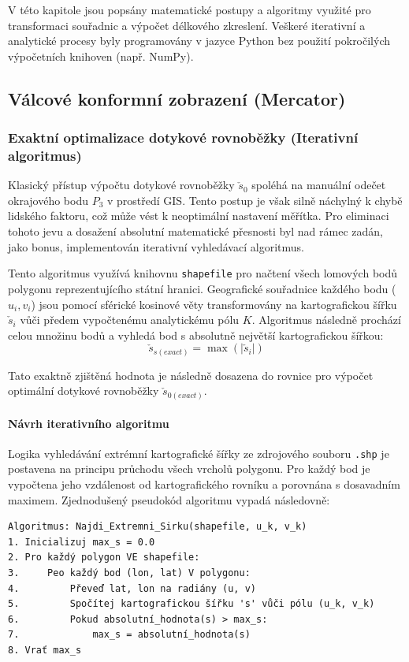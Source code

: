 \documentclass[12pt, a4paper]{article}
\begin{document}
V této kapitole jsou popsány matematické postupy a algoritmy využité pro transformaci souřadnic a výpočet délkového zkreslení. Veškeré iterativní a analytické procesy byly programovány v jazyce Python bez použití pokročilých výpočetních knihoven (např. NumPy).

\subsection{Válcové konformní zobrazení (Mercator)}



\subsubsection{Exaktní optimalizace dotykové rovnoběžky (Iterativní algoritmus)}

Klasický přístup výpočtu dotykové rovnoběžky $\check{s}_0$ spoléhá na manuální odečet okrajového bodu $P_3$ v prostředí GIS. Tento postup je však silně náchylný k chybě lidského faktoru, což může vést k neoptimální nastavení měřítka. Pro eliminaci tohoto jevu a dosažení absolutní matematické přesnosti byl nad rámec zadán, jako bonus, implementován iterativní vyhledávací algoritmus.

Tento algoritmus využívá knihovnu \texttt{shapefile} pro načtení všech lomových bodů polygonu reprezentujícího státní hranici. Geografické souřadnice každého bodu ($u_i, v_i$) jsou pomocí sférické kosinové věty transformovány na kartografickou šířku $\check{s}_i$ vůči předem vypočtenému analytickému pólu $K$. Algoritmus následně prochází celou množinu bodů a vyhledá bod s absolutně největší kartografickou šířkou:
$$ \check{s}_{s(exact)} = \max(| \check{s}_i |) $$

Tato exaktně zjištěná hodnota je následně dosazena do rovnice pro výpočet optimální dotykové rovnoběžky $\check{s}_{0(exact)}$. 

\paragraph{Návrh iterativního algoritmu}
Logika vyhledávání extrémní kartografické šířky ze zdrojového souboru \texttt{.shp} je postavena na principu průchodu všech vrcholů polygonu. Pro každý bod je vypočtena jeho vzdálenost od kartografického rovníku a porovnána s dosavadním maximem. Zjednodušený pseudokód algoritmu vypadá následovně:
\vspace{1.5em}

\hline
\begin{verbatim}
Algoritmus: Najdi_Extremni_Sirku(shapefile, u_k, v_k)
1. Inicializuj max_s = 0.0
2. Pro každý polygon VE shapefile:
3.     Peo každý bod (lon, lat) V polygonu:
4.         Převeď lat, lon na radiány (u, v)
5.         Spočítej kartografickou šířku 's' vůči pólu (u_k, v_k)
6.         Pokud absolutní_hodnota(s) > max_s:
7.             max_s = absolutní_hodnota(s)
8. Vrať max_s
\end{verbatim}
\end{document}
